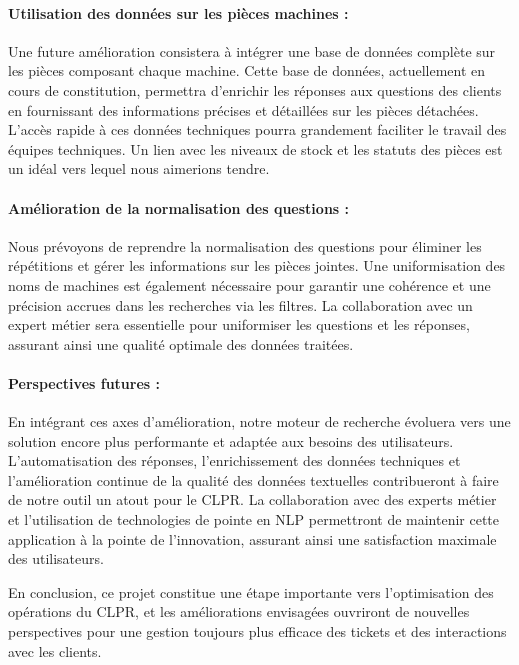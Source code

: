 \documentclass[12pt]{article}
\theoremstyle{definition}
\begin{document}
\paragraph{Utilisation des données sur les pièces machines : }
Une future amélioration consistera à intégrer une base de données complète sur les pièces composant chaque machine. Cette base de données, actuellement en cours de constitution, permettra d'enrichir les réponses aux questions des clients en fournissant des informations précises et détaillées sur les pièces détachées. L'accès rapide à ces données techniques pourra grandement faciliter le travail des équipes techniques. Un lien avec les niveaux de stock et les statuts des pièces est un idéal vers lequel nous aimerions tendre.

\paragraph{Amélioration de la normalisation des questions : }
Nous prévoyons de reprendre la normalisation des questions pour éliminer les répétitions et gérer les informations sur les pièces jointes. Une uniformisation des noms de machines est également nécessaire pour garantir une cohérence et une précision accrues dans les recherches via les filtres. La collaboration avec un expert métier sera essentielle pour uniformiser les questions et les réponses, assurant ainsi une qualité optimale des données traitées.

\paragraph{Perspectives futures : }

En intégrant ces axes d'amélioration, notre moteur de recherche évoluera vers une solution encore plus performante et adaptée aux besoins des utilisateurs. L'automatisation des réponses, l'enrichissement des données techniques et l'amélioration continue de la qualité des données textuelles contribueront à faire de notre outil un atout pour le CLPR. La collaboration avec des experts métier et l'utilisation de technologies de pointe en NLP permettront de maintenir cette application à la pointe de l'innovation, assurant ainsi une satisfaction maximale des utilisateurs.

En conclusion, ce projet constitue une étape importante vers l'optimisation des opérations du CLPR, et les améliorations envisagées ouvriront de nouvelles perspectives pour une gestion toujours plus efficace des tickets et des interactions avec les clients.
\end{document}
